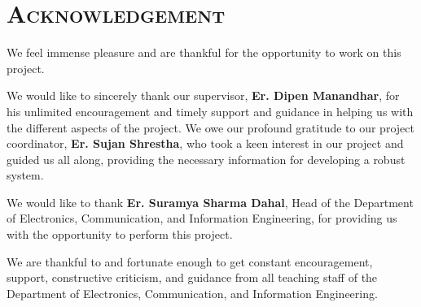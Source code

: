 \chapter*{\scshape Acknowledgement}	
	
	We feel immense pleasure and are thankful for the opportunity to work on this project. 
	
	We would like to sincerely thank our supervisor, \textbf{Er. Dipen Manandhar}, for his unlimited encouragement and timely support and guidance in helping us with the different aspects of the project. We owe our profound gratitude to our project coordinator, \textbf{Er. Sujan Shrestha}, who took a keen interest in our project and guided us all along, providing the necessary information for developing a robust system. 
	
	We would like to thank \textbf{Er. Suramya Sharma Dahal}, Head of the Department of Electronics, Communication, and Information Engineering, for providing us with the opportunity to perform this project. 
	
	We are thankful to and fortunate enough to get constant encouragement, support, constructive criticism, and guidance from all teaching staff of the Department of Electronics, Communication, and Information Engineering.
	
	\vfill %
	

